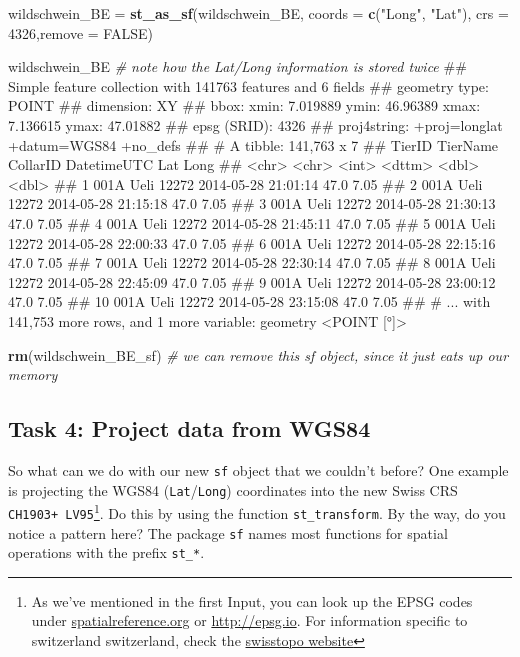 \documentclass[]{book}
\newenvironment{Shaded}{\begin{snugshade}}{\end{snugshade}}
\newcommand{\KeywordTok}[1]{\textcolor[rgb]{0.13,0.29,0.53}{\textbf{{#1}}}}
\newcommand{\DataTypeTok}[1]{\textcolor[rgb]{0.13,0.29,0.53}{{#1}}}
\newcommand{\DecValTok}[1]{\textcolor[rgb]{0.00,0.00,0.81}{{#1}}}
\newcommand{\StringTok}[1]{\textcolor[rgb]{0.31,0.60,0.02}{{#1}}}
\newcommand{\CommentTok}[1]{\textcolor[rgb]{0.56,0.35,0.01}{\textit{{#1}}}}
\newcommand{\OtherTok}[1]{\textcolor[rgb]{0.56,0.35,0.01}{{#1}}}
\newcommand{\NormalTok}[1]{{#1}}
\let\rmarkdownfootnote\footnote%
\def\footnote{\protect\rmarkdownfootnote}
\theoremstyle{definition}
\theoremstyle{definition}
\theoremstyle{definition}
\theoremstyle{remark}
\begin{document}
\begin{Shaded}
\begin{Highlighting}[]
\NormalTok{wildschwein_BE =}\StringTok{ }\KeywordTok{st_as_sf}\NormalTok{(wildschwein_BE, }\DataTypeTok{coords =} \KeywordTok{c}\NormalTok{(}\StringTok{"Long"}\NormalTok{, }\StringTok{"Lat"}\NormalTok{), }\DataTypeTok{crs =} \DecValTok{4326}\NormalTok{,}\DataTypeTok{remove =} \OtherTok{FALSE}\NormalTok{)}

\NormalTok{wildschwein_BE }\CommentTok{# note how the Lat/Long information is stored twice}
\NormalTok{## Simple feature collection with 141763 features and 6 fields}
\NormalTok{## geometry type:  POINT}
\NormalTok{## dimension:      XY}
\NormalTok{## bbox:           xmin: 7.019889 ymin: 46.96389 xmax: 7.136615 ymax: 47.01882}
\NormalTok{## epsg (SRID):    4326}
\NormalTok{## proj4string:    +proj=longlat +datum=WGS84 +no_defs}
\NormalTok{## # A tibble: 141,763 x 7}
\NormalTok{##    TierID TierName CollarID DatetimeUTC           Lat  Long}
\NormalTok{##    <chr>  <chr>       <int> <dttm>              <dbl> <dbl>}
\NormalTok{##  1 001A   Ueli        12272 2014-05-28 21:01:14  47.0  7.05}
\NormalTok{##  2 001A   Ueli        12272 2014-05-28 21:15:18  47.0  7.05}
\NormalTok{##  3 001A   Ueli        12272 2014-05-28 21:30:13  47.0  7.05}
\NormalTok{##  4 001A   Ueli        12272 2014-05-28 21:45:11  47.0  7.05}
\NormalTok{##  5 001A   Ueli        12272 2014-05-28 22:00:33  47.0  7.05}
\NormalTok{##  6 001A   Ueli        12272 2014-05-28 22:15:16  47.0  7.05}
\NormalTok{##  7 001A   Ueli        12272 2014-05-28 22:30:14  47.0  7.05}
\NormalTok{##  8 001A   Ueli        12272 2014-05-28 22:45:09  47.0  7.05}
\NormalTok{##  9 001A   Ueli        12272 2014-05-28 23:00:12  47.0  7.05}
\NormalTok{## 10 001A   Ueli        12272 2014-05-28 23:15:08  47.0  7.05}
\NormalTok{## # ... with 141,753 more rows, and 1 more variable: geometry <POINT [°]>}

\KeywordTok{rm}\NormalTok{(wildschwein_BE_sf) }\CommentTok{# we can remove this sf object, since it just eats up our memory}
\end{Highlighting}
\end{Shaded}

\subsection{Task 4: Project data from
WGS84}\label{task-4-project-data-from-wgs84}

So what can we do with our new \texttt{sf} object that we couldn't
before? One example is projecting the WGS84 (\texttt{Lat}/\texttt{Long})
coordinates into the new Swiss CRS \texttt{CH1903+\ LV95}\footnote{As
  we've mentioned in the first Input, you can look up the EPSG codes
  under
  \href{http://spatialreference.org/ref/epsg/2056/}{spatialreference.org}
  or \url{http://epsg.io}. For information specific to switzerland
  switzerland, check the
  \href{https://www.swisstopo.admin.ch/en/knowledge-facts/surveying-geodesy/reference-systems.html}{swisstopo
  website}}. Do this by using the function \texttt{st\_transform}. By
the way, do you notice a pattern here? The package \texttt{sf} names
most functions for spatial operations with the prefix \texttt{st\_*}.
\end{document}
